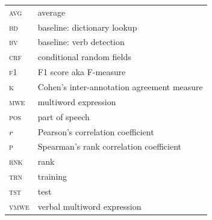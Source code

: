 \documentclass[output=paper,modfonts,nonflat,draftmode]{langsci/langscibook}
\begin{document}
\begin{tabularx}{.48\textwidth}{ll}
\textsc{avg} & average \\
\textsc{bd} & baseline: dictionary lookup \\
\textsc{bv} & baseline: verb detection \\
\textsc{crf} & conditional random fields \\
\textsc{f1} & F1 score aka F-measure \\
\textsc{κ} & Cohen's inter-annotation agreement measure \\
\textsc{mwe} & multiword expression \\
\textsc{pos} & part of speech \\
\textsc{$r$} & Pearson's correlation coefficient \\
\textsc{ρ} & Spearman's rank correlation coefficient \\
\textsc{rnk} & rank \\
\textsc{trn} & training \\
\textsc{tst} & test \\
\textsc{vmwe} & verbal multiword expression \\
\end{tabularx}

{\sloppy
\printbibliography[heading=subbibliography,notkeyword=this]
}
\end{document}

